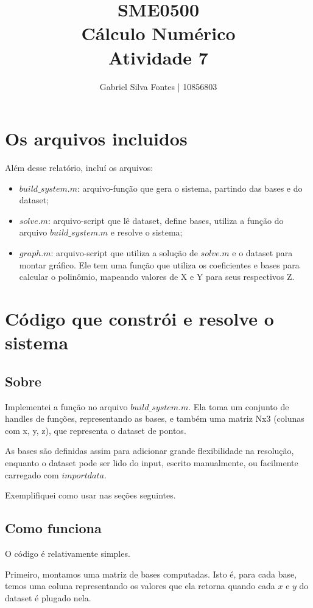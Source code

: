\documentclass[12pt]{article}
\title{SME0500 \\ Cálculo Numérico \\ Atividade 7}
\author{Gabriel Silva Fontes | 10856803}
\begin{document}
\maketitle
\section{Os arquivos incluidos}
Além desse relatório, incluí os arquivos:

\begin{itemize}
    \item \(build\_system.m\): arquivo-função que gera o sistema, partindo das bases e do dataset;

    \item \(solve.m\): arquivo-script que lê dataset, define bases, utiliza a função do arquivo \(build\_system.m\) e resolve o sistema;

    \item \(graph.m\): arquivo-script que utiliza a solução de \(solve.m\) e o dataset para montar gráfico. Ele tem uma função que utiliza os coeficientes e bases para calcular o polinômio, mapeando valores de X e Y para seus respectivos Z.
\end{itemize}

\section{Código que constrói e resolve o sistema}
\subsection{Sobre}
Implementei a função no arquivo \(build\_system.m\). Ela toma um conjunto de handles de funções, representando as bases, e também uma matriz Nx3 (colunas com x, y, z), que representa o dataset de pontos.

As bases são definidas assim para adicionar grande flexibilidade na resolução, enquanto o dataset pode ser lido do input, escrito manualmente, ou facilmente carregado com \(importdata\).

Exemplifiquei como usar nas seções seguintes.

\subsection{Como funciona}
O código é relativamente simples.

Primeiro, montamos uma matriz de bases computadas. Isto é, para cada base, temos uma coluna representando os valores que ela retorna quando cada \(x\) e \(y\) do dataset é plugado nela.
\end{document}
